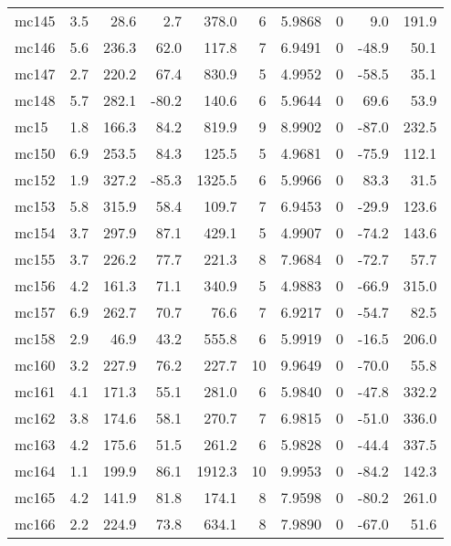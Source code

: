 \documentclass{article}
\begin{document}
\begin{longtable}{lrrrrrrrrr}
 mc145 &  3.5 &   28.6 &   2.7 &   378.0 &   6 &   5.9868 &       0 &      9.0 &     191.9 \\
 mc146 &  5.6 &  236.3 &  62.0 &   117.8 &   7 &   6.9491 &       0 &    -48.9 &      50.1 \\
 mc147 &  2.7 &  220.2 &  67.4 &   830.9 &   5 &   4.9952 &       0 &    -58.5 &      35.1 \\
 mc148 &  5.7 &  282.1 & -80.2 &   140.6 &   6 &   5.9644 &       0 &     69.6 &      53.9 \\
  mc15 &  1.8 &  166.3 &  84.2 &   819.9 &   9 &   8.9902 &       0 &    -87.0 &     232.5 \\
 mc150 &  6.9 &  253.5 &  84.3 &   125.5 &   5 &   4.9681 &       0 &    -75.9 &     112.1 \\
 mc152 &  1.9 &  327.2 & -85.3 &  1325.5 &   6 &   5.9966 &       0 &     83.3 &      31.5 \\
 mc153 &  5.8 &  315.9 &  58.4 &   109.7 &   7 &   6.9453 &       0 &    -29.9 &     123.6 \\
 mc154 &  3.7 &  297.9 &  87.1 &   429.1 &   5 &   4.9907 &       0 &    -74.2 &     143.6 \\
 mc155 &  3.7 &  226.2 &  77.7 &   221.3 &   8 &   7.9684 &       0 &    -72.7 &      57.7 \\
 mc156 &  4.2 &  161.3 &  71.1 &   340.9 &   5 &   4.9883 &       0 &    -66.9 &     315.0 \\
 mc157 &  6.9 &  262.7 &  70.7 &    76.6 &   7 &   6.9217 &       0 &    -54.7 &      82.5 \\
 mc158 &  2.9 &   46.9 &  43.2 &   555.8 &   6 &   5.9919 &       0 &    -16.5 &     206.0 \\
 mc160 &  3.2 &  227.9 &  76.2 &   227.7 &  10 &   9.9649 &       0 &    -70.0 &      55.8 \\
 mc161 &  4.1 &  171.3 &  55.1 &   281.0 &   6 &   5.9840 &       0 &    -47.8 &     332.2 \\
 mc162 &  3.8 &  174.6 &  58.1 &   270.7 &   7 &   6.9815 &       0 &    -51.0 &     336.0 \\
 mc163 &  4.2 &  175.6 &  51.5 &   261.2 &   6 &   5.9828 &       0 &    -44.4 &     337.5 \\
 mc164 &  1.1 &  199.9 &  86.1 &  1912.3 &  10 &   9.9953 &       0 &    -84.2 &     142.3 \\
 mc165 &  4.2 &  141.9 &  81.8 &   174.1 &   8 &   7.9598 &       0 &    -80.2 &     261.0 \\
 mc166 &  2.2 &  224.9 &  73.8 &   634.1 &   8 &   7.9890 &       0 &    -67.0 &      51.6 \\

\end{longtable}
\end{document}
